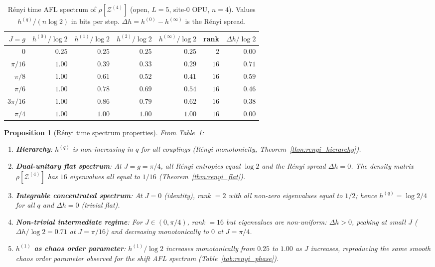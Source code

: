 \documentclass[12pt,a4paper]{article}
\newtheorem{proposition}[theorem]{Proposition}
\begin{document}
\begin{table}[h!]
\centering
\caption{R\'enyi time AFL spectrum of $\rho[\mathcal{Z}^{(4)}]$ (open,
$L=5$, site-0 OPU, $n=4$).  Values $h^{(q)}/(n\log 2)$ in bits per step.
$\Delta h = h^{(0)} - h^{(\infty)}$ is the R\'enyi spread.}
\label{tab:renyi_time_spectrum}
\begin{tabular}{r|rrrr|rr}
\hline
$J=g$ & $h^{(0)}/\log 2$ & $h^{(1)}/\log 2$ & $h^{(2)}/\log 2$
& $h^{(\infty)}/\log 2$ & rank & $\Delta h/\log 2$ \\
\hline
$0$       & $0.25$ & $0.25$ & $0.25$ & $0.25$ & $2$  & $0.00$ \\
$\pi/16$  & $1.00$ & $0.39$ & $0.33$ & $0.29$ & $16$ & $0.71$ \\
$\pi/8$   & $1.00$ & $0.61$ & $0.52$ & $0.41$ & $16$ & $0.59$ \\
$\pi/6$   & $1.00$ & $0.78$ & $0.69$ & $0.54$ & $16$ & $0.46$ \\
$3\pi/16$ & $1.00$ & $0.86$ & $0.79$ & $0.62$ & $16$ & $0.38$ \\
$\pi/4$   & $1.00$ & $1.00$ & $1.00$ & $1.00$ & $16$ & $0.00$ \\
\hline
\end{tabular}
\end{table}

\begin{proposition}[Rényi time spectrum properties]
  \label{prop:renyi_time}
  From Table~\ref{tab:renyi_time_spectrum}:
  \begin{enumerate}
    \item \textbf{Hierarchy}: $h^{(q)}$ is non-increasing in $q$ for all
      couplings (Rényi monotonicity, Theorem~\ref{thm:renyi_hierarchy}).
    \item \textbf{Dual-unitary flat spectrum}: At $J=g=\pi/4$, all R\'enyi
      entropies equal $\log 2$ and the R\'enyi spread $\Delta h=0$.  The
      density matrix $\rho[\mathcal{Z}^{(4)}]$ has $16$ eigenvalues all equal
      to $1/16$ (Theorem~\ref{thm:renyi_flat}).
    \item \textbf{Integrable concentrated spectrum}: At $J=0$ (identity),
      rank $=2$ with all non-zero eigenvalues equal to $1/2$; hence
      $h^{(q)}=\log 2/4$ for all $q$ and $\Delta h=0$ (trivial flat).
    \item \textbf{Non-trivial intermediate regime}: For $J\in(0,\pi/4)$,
      rank $=16$ but eigenvalues are \emph{non-uniform}: $\Delta h>0$,
      peaking at small $J$ ($\Delta h/\log 2 = 0.71$ at $J=\pi/16$)
      and decreasing monotonically to $0$ at $J=\pi/4$.
    \item \textbf{$h^{(1)}$ as chaos order parameter}: $h^{(1)}/\log 2$
      increases monotonically from $0.25$ to $1.00$ as $J$ increases,
      reproducing the same smooth chaos order parameter observed for the
      shift AFL spectrum (Table~\ref{tab:renyi_phase}).
  \end{enumerate}
\end{proposition}
\end{document}

